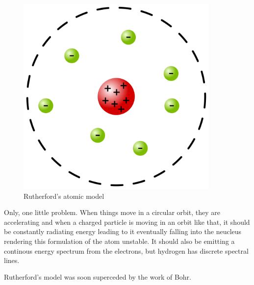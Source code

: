 \begin{figure}[H]
  \centering
  \includegraphics[width=100mm]{figures/rutherford.png}
  \caption{Rutherford's atomic model}
  \label{rutherford}
\end{figure}

Only, one little problem.
When things move in a circular orbit, they are accelerating and when a charged particle is moving in an orbit like that,  it should be constantly radiating energy leading to it eventually falling into the neucleus rendering this formulation of the atom unstable.
It should also be emitting a continous energy spectrum from the electrons, but hydrogen has discrete spectral lines.

Rutherford's model was soon superceded by the work of Bohr.
